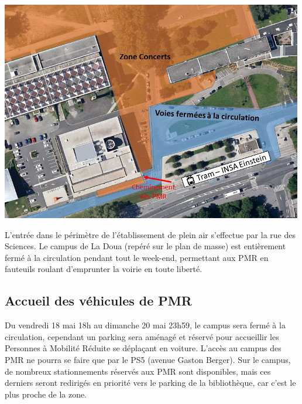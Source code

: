 \documentclass[hidelinks, paper=a4, fontsize=13pt]{report}
\begin{document}
\begin{center}
\includegraphics[width=\textwidth,keepaspectratio]{Annexes/Images/PMR_entree}
\end{center}
L’entrée dans le périmètre de l’établissement de plein air s’effectue par la rue des Sciences. Le campus de La Doua (repéré sur le plan de masse) est entièrement fermé à la circulation pendant tout le week-end, permettant aux PMR en fauteuils roulant d’emprunter la voirie en toute liberté.

\subsection{Accueil des véhicules de PMR}

Du vendredi 18 mai 18h au dimanche 20 mai 23h59, le campus sera fermé à la circulation, cependant un parking sera aménagé et réservé pour accueillir les Personnes à Mobilité Réduite se déplaçant en voiture. L’accès au campus des PMR ne pourra se faire que par le PS5 (avenue Gaston Berger). Sur le campus, de nombreux stationnements réservés aux PMR sont disponibles, mais ces derniers seront redirigés en priorité vers le parking de la bibliothèque, car c'est le plus proche de la zone.
\end{document}

